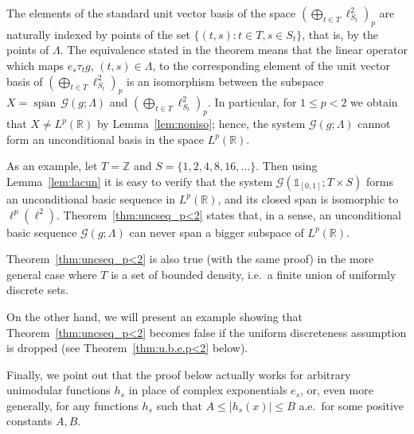 \documentclass[reqno,a4paper,12pt]{amsart}
\numberwithin{equation}{section}
\numberwithin{figure}{section}
\newcommand\R{\mathbb{R}}
\newcommand\Z{\mathbb{Z}}
\newcommand\G{\mathcal{G}}
\newcommand\1{\mathds{1}}
\newcommand{\TTT}{T}
\newcommand{\SSS}{S}
\newcommand{\ts}{\tau}
\renewcommand\le{\leqslant}
\newcommand{\cspan}{\overline{\operatorname{span}}}
\theoremstyle{plain}
\newcommand{\thmref}[1]{Theorem~\ref{#1}}
\newcommand{\lemref}[1]{Lemma~\ref{#1}}
\theoremstyle{definition}
\begin{document}
The elements of the standard unit vector basis of the space $(\bigoplus_{t\in \TTT} \ell^2_{\SSS_t})_p$ are naturally indexed by points of the set $\{(t,s): t\in \TTT, s\in \SSS_t\}$, that is, by the points of $\Lambda$. The equivalence stated in the theorem means that the linear operator which maps $e_s \ts_tg$, $(t,s)\in \Lambda$, to the corresponding element of the unit vector basis of $(\bigoplus_{t\in \TTT} \ell^2_{\SSS_t})_p$ is an isomorphism between the subspace $X = \cspan \, \G(g;\Lambda)$ and $(\bigoplus_{t\in \TTT} \ell^2_{\SSS_t})_p$.
In particular, for $1 \le p < 2$ we obtain that
$X \neq L^p(\R)$ by \lemref{lem:noniso}; hence,
the system $\G(g;\Lambda)$ cannot form
an unconditional basis  in the space $L^p(\R)$.

As an example, let $\TTT=\Z$ and $\SSS = \{1,2,4,8,16,\dots\}$. Then using \lemref{lem:lacun} it is easy to verify that the system $\G(\1_{[0,1]};\TTT\times \SSS)$ forms an unconditional basic sequence in $L^p(\R)$, and
its closed span is isomorphic to $\ell^p(\ell^2)$. \thmref{thm:uncseq_p<2} states that, in a sense, an unconditional basic sequence $\G(g;\Lambda)$ can never span a bigger subspace of $L^p(\R)$.

\thmref{thm:uncseq_p<2} is also true (with the same proof) in the more general case where $\TTT$ is a set of bounded density, i.e.\ a finite union of uniformly discrete sets.

On the other hand, we will present an example showing that 
\thmref{thm:uncseq_p<2} becomes false 
if the uniform discreteness assumption is dropped
(see \thmref{thm:u.b.e.p<2} below).


Finally, we point out that the proof below actually works for arbitrary uni\-modular functions $h_s$ in place of complex exponentials $e_s$, or, even more generally, for any func\-tions $h_s$ such that $A \le |h_s(x)|\le B$ a.e.\ for some positive constants $A,B$.
\end{document}
